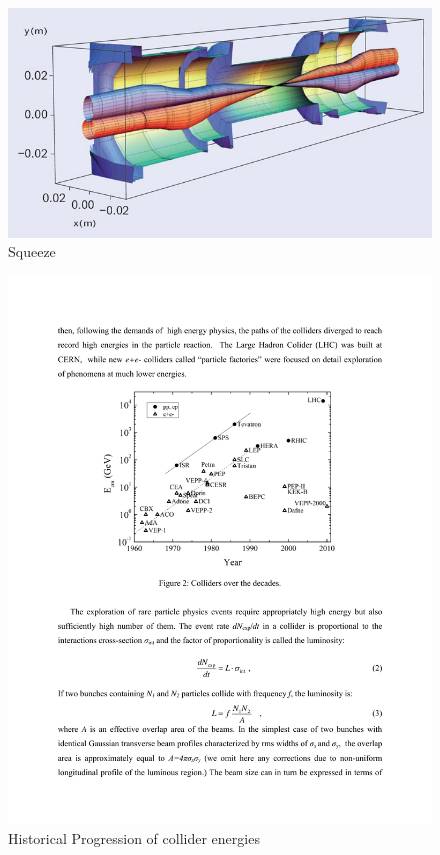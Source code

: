 \begin{figure}
\begin{center}
\includegraphics[width=.7\textwidth]{pics/beam_squeeze}
\caption{Squeeze}
\end{center}
\end{figure}


\begin{figure}
\begin{center}
\includegraphics[width=.75\textwidth]{pics/collider_energies}
\caption{Historical Progression of collider energies}
\end{center}
\end{figure}



